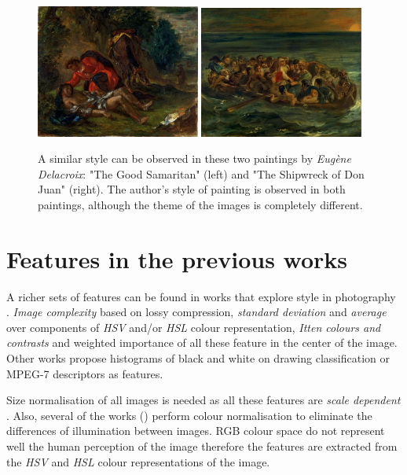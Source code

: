 \documentclass[11pt,a4paper,twoside,openright,draft]{report}
\begin{document}
\begin{multicols}{2}
\begin{figure}[tb]
\centering
\includegraphics[width=0.48\textwidth]{sim_delacroix_samaritan}
\includegraphics[width=0.48\textwidth]{sim_delacroix_shipwreck}
\caption[Example of similar styles]{A similar style can be observed in these
two paintings by \emph{Eug\`ene Delacroix}: "The Good Samaritan" (left) and
"The Shipwreck of Don Juan" (right).  The author's style of painting is
observed in both paintings, although the theme of the images is completely
different.}
\label{fig:similar}
\end{figure}

\section{Features in the previous works}

A richer sets of features can be found in works that explore style in
photography \cite{jma12clas,cmrc13fs,rmc12ajs,mach10clas}.  \emph{Image
complexity} based on lossy compression, \emph{standard deviation} and
\emph{average} over components of \emph{HSV} and/or \emph{HSL} colour
representation, \emph{Itten colours and contrasts} and weighted importance of
all these feature in the center of the image.  Other works propose histograms
of black and white on drawing classification \cite{kroner98draw} or MPEG-7
descriptors as features.

Size normalisation of all images is needed as all these features are
\emph{scale dependent} \cite{jma12clas,mach10clas}.  Also, several of the works
(\cite{jma12clas,cmrc13fs,rmc12ajs}) perform colour normalisation to eliminate
the differences of illumination between images.  RGB colour space do not
represent well the human perception of the image \cite{mach10clas} therefore
the features are extracted from the \emph{HSV} and \emph{HSL} colour
representations of the image.


\end{multicols}
\end{document}
